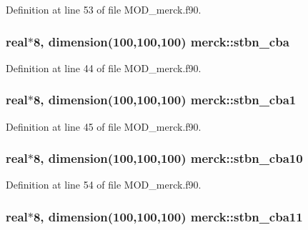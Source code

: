 Definition at line 53 of file M\-O\-D\-\_\-merck.\-f90.

\hypertarget{classmerck_a424fc725470a2afe10ec6a2ba8392ea7}{
\subsubsection[{stbn\-\_\-cba}]{\setlength{\rightskip}{0pt plus 5cm}real$\ast$8, dimension(100,100,100) merck\-::stbn\-\_\-cba}}\label{classmerck_a424fc725470a2afe10ec6a2ba8392ea7}


Definition at line 44 of file M\-O\-D\-\_\-merck.\-f90.

\hypertarget{classmerck_a0f41d68964ee35708b21207d39b37b74}{
\subsubsection[{stbn\-\_\-cba1}]{\setlength{\rightskip}{0pt plus 5cm}real$\ast$8, dimension(100,100,100) merck\-::stbn\-\_\-cba1}}\label{classmerck_a0f41d68964ee35708b21207d39b37b74}


Definition at line 45 of file M\-O\-D\-\_\-merck.\-f90.

\hypertarget{classmerck_ad68a5cfd0ac42b5cbff684365a1f96a5}{
\subsubsection[{stbn\-\_\-cba10}]{\setlength{\rightskip}{0pt plus 5cm}real$\ast$8, dimension(100,100,100) merck\-::stbn\-\_\-cba10}}\label{classmerck_ad68a5cfd0ac42b5cbff684365a1f96a5}


Definition at line 54 of file M\-O\-D\-\_\-merck.\-f90.

\hypertarget{classmerck_a599ef328ccf7e65f4f6217c7e80b902c}{
\subsubsection[{stbn\-\_\-cba11}]{\setlength{\rightskip}{0pt plus 5cm}real$\ast$8, dimension(100,100,100) merck\-::stbn\-\_\-cba11}}\label{classmerck_a599ef328ccf7e65f4f6217c7e80b902c}


